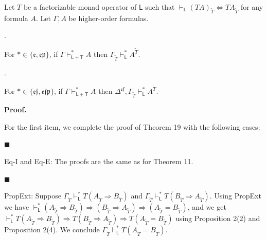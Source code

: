  
Let $T$ be a factorizable monad operator of $\mathsf{L}$ such that $\vdash_{\mathsf{L}}(TA)_{\widetilde{T}}\Leftrightarrow TA_{\widetilde{T}}$ for any formula $A$. Let $\Gamma,A$ be higher-order formulas.\par
  
\par{}. 
 
For $*\in\{\mathfrak{e},\mathfrak{e}\mathfrak{p}\}$, if $\Gamma\vdash_{\mathsf{L}+\mathsf{T}}^{*}A$ then $\Gamma_{\widetilde{T}}\vdash_{\mathsf{L}}^{*}A^{\widetilde{T}}$.\par
 
 
 
\par{}. 
 
For $*\in\{\mathfrak{e}\mathfrak{f},\mathfrak{e}\mathfrak{f}\mathfrak{p}\}$, if $\Gamma\vdash_{\mathsf{L}+\mathsf{T}}^{*}A$ then $\Delta^{\mathfrak{e}\mathfrak{f}},\Gamma_{\widetilde{T}}\vdash_{\mathsf{L}}^{*}A^{\widetilde{T}}$.\par
 
 
  
 
 
 
 
\par\medskip\noindent\textbf{Proof.}\par
 
 
For the first item, we complete the proof of Theorem 19 with the following cases:\par
  
\par\noindent  $\blacksquare$ 
 
Eq-I and Eq-E: The proofs are the same as for Theorem 11.\par
 
 
 
\par\noindent  $\blacksquare$ 
 
PropExt: Suppose $\Gamma_{\widetilde{T}}\vdash_{\mathsf{L}}^{*}T(A_{\widetilde{T}}\mathbin{\Rightarrow}B_{\widetilde{T}})$ and $\Gamma_{\widetilde{T}}\vdash_{\mathsf{L}}^{*}T(B_{\widetilde{T}}\mathbin{\Rightarrow}A_{\widetilde{T}})$. Using PropExt we have $\vdash_{\mathsf{L}}^{*}(A_{\widetilde{T}}\mathbin{\Rightarrow}B_{\widetilde{T}})\mathbin{\Rightarrow}(B_{\widetilde{T}}\mathbin{\Rightarrow}A_{\widetilde{T}})\mathbin{\Rightarrow}(A_{\widetilde{T}}=B_{\widetilde{T}})$, and we get $\vdash_{\mathsf{L}}^{*}T(A_{\widetilde{T}}\mathbin{\Rightarrow}B_{\widetilde{T}})\mathbin{\Rightarrow}T(B_{\widetilde{T}}\mathbin{\Rightarrow}A_{\widetilde{T}})\mathbin{\Rightarrow}T(A_{\widetilde{T}}=B_{\widetilde{T}})$ using Proposition 2(2) and Proposition 2(4). We conclude $\Gamma_{\widetilde{T}}\vdash_{\mathsf{L}}^{*}T(A_{\widetilde{T}}=B_{\widetilde{T}})$.\par
 
